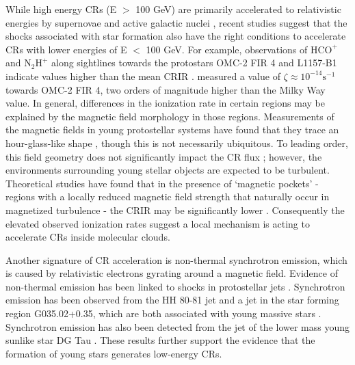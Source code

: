 \documentclass[twocolumn]{aastex63}
\def\t{\text}
\begin{document}
While high energy CRs (E $>$ 100 GeV) are primarily accelerated to relativistic energies by supernovae and active galactic nuclei \citep{morlino_2017_supernovae, berezhko_2008_AGNs}, recent studies suggest that the shocks associated with star formation also have the right conditions to accelerate CRs with lower energies of E $<$ 100 GeV. For example, observations of $\t{HCO}^+$ and $\t{N}_2\t{H}^+$ along sightlines towards the protostars OMC-2 FIR 4 and L1157-B1 indicate values higher than the mean CRIR \citep{ceccarelli_2014_omc, fontani_2017_omc2, podio_2014_shock}. \cite{favre_2018_omc} measured a value of $\zeta \approx 10^{-14} \t{s}^{-1}$ towards OMC-2 FIR 4, two orders of magnitude higher than the Milky Way value. In general, differences in the ionization rate in certain regions may be explained by the magnetic field morphology in those regions. Measurements of the magnetic fields in young protostellar systems have found that they trace an hour-glass-like shape \citep{girart_2006_bfield}, though this is not necessarily ubiquitous. To leading order, this field geometry does not significantly impact the CR flux \citep{fatuzzo_2014_clouds}; however, the environments surrounding young stellar objects are expected to be turbulent. Theoretical studies have found that in the presence of `magnetic pockets' - regions with a locally reduced magnetic field strength that naturally occur in magnetized turbulence - the CRIR may be significantly lower \citep{fatuzzo_2014_clouds, silsbee_2018_turbulence}. Consequently the elevated observed ionization rates suggest a local mechanism is acting to accelerate CRs inside molecular clouds.

Another signature of CR acceleration is non-thermal synchrotron emission, which is caused by relativistic electrons gyrating around a magnetic field. Evidence of non-thermal emission has been linked to shocks in protostellar jets \citep{anglada_2018_jets}. Synchrotron emission has been observed from the HH 80-81 jet and a jet in the star forming region G035.02+0.35, which are both associated with young massive stars \citep{kamenetzky_2017_hh80, sanna_2019_protostellar}. Synchrotron emission has also been detected from the jet of the lower mass young sunlike star DG Tau \citep{ainsworth_2014_dgtau}. These results further support the evidence that the formation of young stars generates low-energy CRs. 
\end{document}
